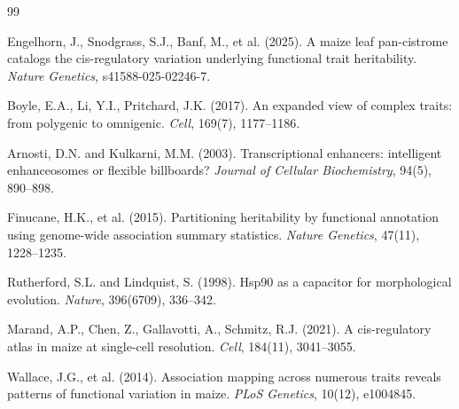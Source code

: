 \documentclass[11pt,a4paper]{article}
\begin{document}

\begin{thebibliography}{99}

Engelhorn, J., Snodgrass, S.J., Banf, M., et al. (2025).
A maize leaf pan-cistrome catalogs the cis-regulatory variation underlying
functional trait heritability.
\emph{Nature Genetics}, s41588-025-02246-7.

Boyle, E.A., Li, Y.I., Pritchard, J.K. (2017).
An expanded view of complex traits: from polygenic to omnigenic.
\emph{Cell}, 169(7), 1177--1186.

Arnosti, D.N. and Kulkarni, M.M. (2003).
Transcriptional enhancers: intelligent enhanceosomes or flexible billboards?
\emph{Journal of Cellular Biochemistry}, 94(5), 890--898.

Finucane, H.K., et al. (2015).
Partitioning heritability by functional annotation using genome-wide
association summary statistics.
\emph{Nature Genetics}, 47(11), 1228--1235.

Rutherford, S.L. and Lindquist, S. (1998).
Hsp90 as a capacitor for morphological evolution.
\emph{Nature}, 396(6709), 336--342.

Marand, A.P., Chen, Z., Gallavotti, A., Schmitz, R.J. (2021).
A cis-regulatory atlas in maize at single-cell resolution.
\emph{Cell}, 184(11), 3041--3055.

Wallace, J.G., et al. (2014).
Association mapping across numerous traits reveals patterns of functional
variation in maize.
\emph{PLoS Genetics}, 10(12), e1004845.

\end{thebibliography}
\end{document}
